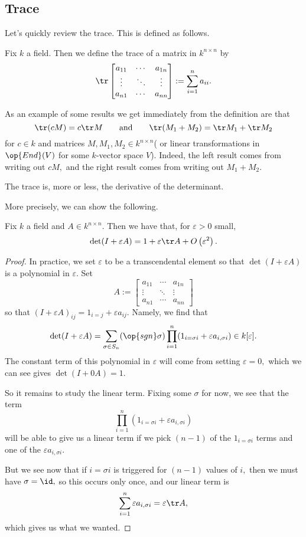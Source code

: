\documentclass[../notes.tex]{subfiles}
\begin{document}
\subsection{Trace}
Let's quickly review the trace. This is defined as follows.
\begin{definition}[Trace]
	Fix $k$ a field. Then we define the trace of a matrix in $k^{n\times n}$ by
	\[\tr \begin{bmatrix}
		a_{11} & \cdots & a_{1n} \\
		\vdots & \ddots & \vdots \\
		a_{n1} & \cdots & a_{nn}
	\end{bmatrix}:=\sum_{i=1}^na_{ii}.\]
\end{definition}
\begin{remark}[Nir]
	As an example of some results we get immediately from the definition are that
	\[\tr(cM)=c\tr M\qquad\text{and}\qquad\tr(M_1+M_2)=\tr M_1+\tr M_2\]
	for $c\in k$ and matrices $M,M_1,M_2\in k^{n\times n}$( or linear transformations in $\op{End}(V)$ for some $k$-vector space $V$). Indeed, the left result comes from writing out $cM,$ and the right result comes from writing out $M_1+M_2.$
\end{remark}
\begin{idea}
	The trace is, more or less, the derivative of the determinant.
\end{idea}
More precisely, we can show the following.
\begin{exe} \label{exe:ddxdet}
	Fix $k$ a field and $A\in k^{n\times n}.$ Then we have that, for $\varepsilon>0$ small,
	\[\det(I+\varepsilon A)=1+\varepsilon\tr A+O\left(\varepsilon^2\right).\]
\end{exe}
\begin{proof}
	In practice, we set $\varepsilon$ to be a transcendental element so that $\det(I+\varepsilon A)$ is a polynomial in $\varepsilon.$ Set
	\[A:=\begin{bmatrix}
		a_{11} & \cdots & a_{1n} \\
		\vdots & \ddots & \vdots \\
		a_{n1} & \cdots & a_{nn}
	\end{bmatrix}\]
	so that $(I+\varepsilon A)_{ij}=1_{i=j}+\varepsilon a_{ij}.$ Namely, we find that
	\[\det(I+\varepsilon A)=\sum_{\sigma\in S_n}(\op{sgn}\sigma)\prod_{i=1}^n(1_{i=\sigma i}+\varepsilon a_{i,\sigma i})\in k[\varepsilon].\]
	The constant term of this polynomial in $\varepsilon$ will come from setting $\varepsilon=0,$ which we can see gives $\det(I+0A)=1.$

	So it remains to study the linear term. Fixing some $\sigma$ for now, we see that the term
	\[\prod_{i=1}^n(1_{i=\sigma i}+\varepsilon a_{i,\sigma i})\]
	will be able to give us a linear term if we pick $(n-1)$ of the $1_{i=\sigma i}$ terms and one of the $\varepsilon a_{i,\sigma i}.$
	
	But we see now that if $i=\sigma i$ is triggered for $(n-1)$ values of $i,$ then we must have $\sigma=\id,$ so this occurs only once, and our linear term is
	\[\sum_{i=1}^n\varepsilon a_{i,\sigma i}=\varepsilon\tr A,\]
	which gives us what we wanted.
\end{proof}
\end{document}
